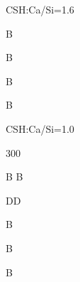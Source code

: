 \documentclass[a4paper,portrait,12pt]{article}
\begin{document}
\begin{flushleft}
CSH:Ca/Si=1.6
\end{flushleft}





\begin{flushleft}
B
\end{flushleft}





\begin{flushleft}
B
\end{flushleft}





\begin{flushleft}
B
\end{flushleft}





\begin{flushleft}
B
\end{flushleft}





\begin{flushleft}
CSH:Ca/Si=1.0
\end{flushleft}





300


\begin{flushleft}
B B
\end{flushleft}


\begin{flushleft}
DD
\end{flushleft}





\begin{flushleft}
B
\end{flushleft}





\begin{flushleft}
B
\end{flushleft}





\begin{flushleft}
B
\end{flushleft}
\end{document}
